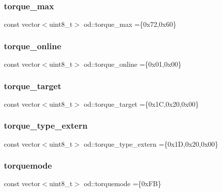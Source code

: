 \subsubsection{\texorpdfstring{torque\+\_\+max}{torque\_max}}
{\footnotesize\ttfamily const vector$<$uint8\+\_\+t$>$ od\+::torque\+\_\+max =\{0x72,0x60\}}

\mbox{\label{namespaceod_ada58f32a60ef9137c7e9c4f4f54ace10}} 
\subsubsection{\texorpdfstring{torque\+\_\+online}{torque\_online}}
{\footnotesize\ttfamily const vector$<$uint8\+\_\+t$>$ od\+::torque\+\_\+online =\{0x01,0x00\}}

\mbox{\label{namespaceod_a3059829b7387e81bd7bad08c15364497}} 
\subsubsection{\texorpdfstring{torque\+\_\+target}{torque\_target}}
{\footnotesize\ttfamily const vector$<$uint8\+\_\+t$>$ od\+::torque\+\_\+target =\{0x1\+C,0x20,0x00\}}

\mbox{\label{namespaceod_afc052d3983ca0866a0b8cd5d0fc5deaa}} 
\subsubsection{\texorpdfstring{torque\+\_\+type\+\_\+extern}{torque\_type\_extern}}
{\footnotesize\ttfamily const vector$<$uint8\+\_\+t$>$ od\+::torque\+\_\+type\+\_\+extern =\{0x1\+D,0x20,0x00\}}

\mbox{\label{namespaceod_a53c06ba9dc3fe72c8fd5fed43563a4a0}} 
\subsubsection{\texorpdfstring{torquemode}{torquemode}}
{\footnotesize\ttfamily const vector$<$uint8\+\_\+t$>$ od\+::torquemode =\{0x\+F\+B\}}

